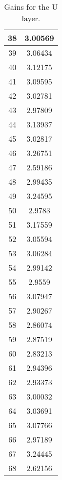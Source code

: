 \begin{table}[h]
\begin{subtable}[h]{2in}
{\begin{tabular}{|c|c|}
38	&	3.00569	\\	\hline
39	&	3.06434	\\	\hline
40	&	3.12175	\\	\hline
41	&	3.09595	\\	\hline
42	&	3.02781	\\	\hline
43	&	2.97809	\\	\hline
44	&	3.13937	\\	\hline
45	&	3.02817	\\	\hline
46	&	3.26751	\\	\hline
47	&	2.59186	\\	\hline
48	&	2.99435	\\	\hline
49	&	3.24595	\\	\hline
50	&	2.9783	\\	\hline
51	&	3.17559	\\	\hline
52	&	3.05594	\\	\hline
53	&	3.06284	\\	\hline
54	&	2.99142	\\	\hline
55	&	2.9559	\\	\hline
56	&	3.07947	\\	\hline
57	&	2.90267	\\	\hline
58	&	2.86074	\\	\hline
59	&	2.87519	\\	\hline
60	&	2.83213	\\	\hline
61	&	2.94396	\\	\hline
62	&	2.93373	\\	\hline
63	&	3.00032	\\	\hline
64	&	3.03691	\\	\hline
65	&	3.07766	\\	\hline
66	&	2.97189	\\	\hline
67	&	3.24445	\\	\hline
68	&	2.62156	\\	\hline
        \end{tabular}
        }
        \caption{Gains for the U layer.}
    \end{subtable}
    \quad
    \begin{subtable}[h]{2in}
        \centering{}
\end{subtable}
\end{table}
